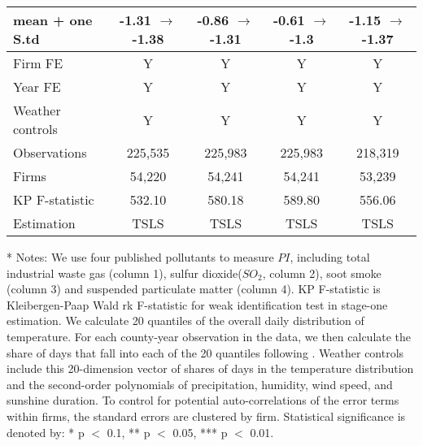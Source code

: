 \documentclass[12pt]{article}
\begin{document}
\begin{table}[H]
\begin{tabular}{l*{4}{c}}
      mean + one S.td        &-1.31  $\rightarrow$ -1.38&	-0.86 $\rightarrow$ -1.31&            	     -0.61 $\rightarrow$ -1.3&	    -1.15 $\rightarrow$ -1.37\\
      \hline
      Firm FE &Y&Y&Y&Y\\
      Year FE &Y&Y&Y&Y\\
      Weather controls &Y&Y&Y&Y\\
      \hline
      Observations 	         &225,535&	225,983&	225,983&	218,319 \\
      Firms	                 &54,220	&54,241	&54,241&	53,239 \\
      KP F-statistic	       &532.10&	580.18&	589.80&	556.06 \\
      Estimation      &TSLS&TSLS&TSLS&TSLS\\
      \hline\hline
  \end{tabular}
  \begin{tablenotes}
    \item[*] \small Notes: We use four published pollutants to measure $PI$, including total industrial waste gas (column 1), sulfur dioxide($SO_{2}$, column 2), soot smoke (column 3) and suspended particulate matter (column 4). KP F-statistic is Kleibergen-Paap Wald rk F-statistic for weak identification test in stage-one estimation. We calculate 20 quantiles of the overall daily distribution of temperature. For each county-year observation in the data, we then calculate the share of days that fall into each of the 20 quantiles following \citep{deschenes2017defensive}. Weather controls include this 20-dimension vector of shares of days in the temperature distribution and the second-order polynomials of precipitation, humidity, wind speed, and sunshine duration. To control for potential auto-correlations of the error terms within firms, the standard errors are clustered by firm. Statistical significance is denoted by: * p $<$ 0.1, ** p $<$ 0.05, *** p $<$ 0.01.
  \end{tablenotes}
  \end{table}
\end{document}
